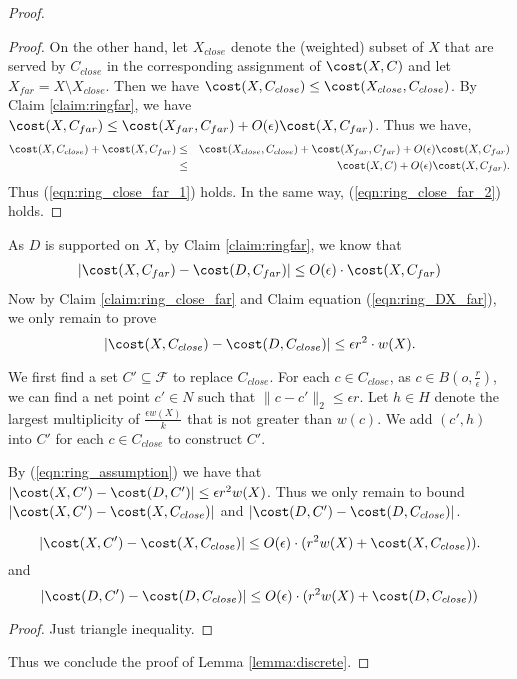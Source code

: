 \begin{proof}
\begin{proof}
On the other hand, let $X_{close}$ denote the (weighted) subset of $X$ that are served by $C_{close}$ in the corresponding assignment of $\cost(X,C)$ and let $X_{far}=X\setminus X_{close}$. Then we have $\cost(X,C_{close})\leq \cost(X_{close},C_{close})$. By Claim \ref{claim:ringfar}, we have $\cost(X,C_{far})\leq \cost(X_{far},C_{far})+ O(\epsilon) \cost(X,C_{far})$. Thus we have,
\begin{eqnarray*}
\cost(X,C_{close})+\cost(X,C_{far})&\leq& \cost(X_{close},C_{close})+\cost(X_{far},C_{far})+O(\epsilon) \cost(X,C_{far})\\
&\leq &\cost(X,C)+O(\epsilon)\cost(X,C_{far}).
\end{eqnarray*}
Thus (\ref{eqn:ring_close_far_1}) holds. In the same way, (\ref{eqn:ring_close_far_2}) holds.
\end{proof}

As $D$ is supported on $X$, by Claim \ref{claim:ringfar}, we know that \begin{eqnarray}
|\cost(X,C_{far})-\cost(D,C_{far})|\leq O(\epsilon)\cdot \cost(X,C_{far}) \label{eqn:ring_DX_far}
\end{eqnarray}
Now by Claim \ref{claim:ring_close_far} and Claim equation (\ref{eqn:ring_DX_far}), we only remain to prove $$
|\cost(X,C_{close})-\cost(D,C_{close})|\leq \epsilon r^2\cdot w(X).
$$

We first find a set $C'\subseteq \mathcal{F}$ to replace $C_{close}$. For each $c\in C_{close}$, as $c\in B(o,\frac{r}{\epsilon})$, we can find a net point $c'\in N$ such that $\|c-c'\|_2\leq \epsilon r$. Let $h\in H$ denote the largest multiplicity of $\frac{\epsilon w(X)}{k}$ that is not greater than $w(c)$. We add $(c',h)$ into $C'$ for each $c\in C_{close}$ to construct $C'$.

By (\ref{eqn:ring_assumption}) we have that $|\cost(X,C')-\cost(D,C')|\leq \epsilon r^2 w(X)$. Thus we only remain to bound $|\cost(X,C')-\cost(X,C_{close})|$ and $|\cost(D,C')-\cost(D,C_{close})|$.

\begin{claim}
$$
|\cost(X,C')-\cost(X,C_{close})|\leq O(\epsilon)\cdot (r^2 w(X)+\cost(X,C_{close})).
$$ and
$$
|\cost(D,C')-\cost(D,C_{close})|\leq O(\epsilon)\cdot (r^2 w(X)+\cost(D,C_{close}))
$$
\end{claim}
\begin{proof}
Just triangle inequality.
\end{proof}

Thus we conclude the proof of Lemma \ref{lemma:discrete}.

\end{proof}



